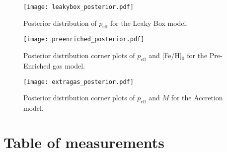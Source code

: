 \documentclass[twocolumn]{aastex63}
\begin{document}
\begin{figure}
    \centering
    \texttt{[image: leakybox\_posterior.pdf]}
    \caption{Posterior distribution of $p_{\mbox{eff}}$ for the Leaky Box model.}
    \label{fig:leakybox_posterior}
\end{figure}

\begin{figure}
    \centering
    \texttt{[image: preenriched\_posterior.pdf]}
    \caption{Posterior distribution corner plots of $p_{\mbox{eff}}$ and [Fe/H]$_{0}$ for the Pre-Enriched gas model.}
    \label{fig:preenriched_posterior}
\end{figure}

\begin{figure}
    \centering
    \texttt{[image: extragas\_posterior.pdf]}
    \caption{Posterior distribution corner plots of $p_{\mbox{eff}}$ and $M$ for the Accretion model.}
    \label{fig:extragas_posterior}
\end{figure}


\section{Table of measurements}
\end{document}
